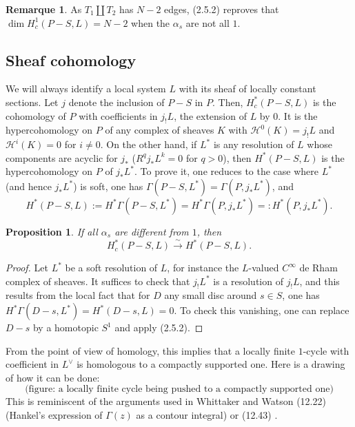 \documentclass[12pt,a4paper]{article}
\theoremstyle{plain}
\newtheorem{proposition}[theorem]{Proposition}
\theoremstyle{definition}
\newtheorem{remark}[theorem]{Remarque}
\theoremstyle{remark}
\numberwithin{equation}{section}
\begin{document}
\begin{remark}
As $T_1 \amalg T_2$ has $N-2$ edges, (2.5.2) reproves that $\dim H^1_c(P-S, L) = N-2$ when the $\alpha_s$ are not all $1$.
\end{remark}

\subsection{Sheaf cohomology}
We will always identify a local system $L$ with its sheaf of locally constant sections. Let $j$ denote the inclusion of $P-S$ in $P$. Then, $H^*_c(P-S, L)$ is the cohomology of $P$ with coefficients in $j_!L$, the extension of $L$ by $0$. It is the hypercohomology on $P$ of any complex of sheaves $K$ with $\mathscr{H}^0(K) = j_!L$ and $\mathscr{H}^i(K) = 0$ for $i \neq 0$. On the other hand, if $L^*$ is any resolution of $L$ whose components are acyclic for $j_*$ ($R^qj_*L^k = 0$ for $q > 0$), then $H^*(P-S, L)$ is the hypercohomology on $P$ of $j_*L^*$. To prove it, one reduces to the case where $L^*$ (and hence $j_*L^*$) is soft, one has $\Gamma(P-S, L^*) = \Gamma(P, j_*L^*)$, and
\[
H^*(P-S, L) := H^*\Gamma(P-S, L^*) = H^*\Gamma(P, j_*L^*) =: H^*(P, j_*L^*).
\]

\begin{proposition}\label{prop:2.6.1}
If all $\alpha_s$ are different from $1$, then
\[
H^*_c(P-S, L) \xrightarrow{\sim} H^*(P-S, L).
\]
\end{proposition}

\begin{proof}
Let $L^*$ be a soft resolution of $L$, for instance the $L$-valued $C^\infty$ de Rham complex of sheaves. It suffices to check that $j_!L^*$ is a resolution of $j_!L$, and this results from the local fact that for $D$ any small disc around $s \in S$, one has $H^*\Gamma(D-s, L^*) = H^*(D-s, L) = 0$. To check this vanishing, one can replace $D-s$ by a homotopic $S^1$ and apply (2.5.2).
\end{proof}

From the point of view of homology, this implies that a locally finite $1$-cycle with coefficient in $L^\vee$ is homologous to a compactly supported one. Here is a drawing of how it can be done:
\[
\text{(figure: a locally finite cycle being pushed to a compactly supported one)}
\]
This is reminiscent of the arguments used in Whittaker and Watson (12.22) (Hankel's expression of $\Gamma(z)$ as a contour integral) or (12.43) \cite{WW}.
\end{document}
